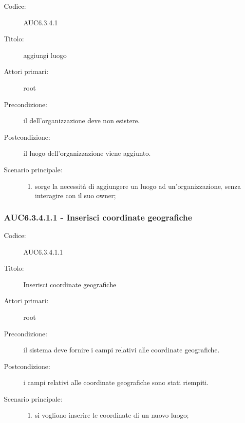\documentclass[casi-duso]{subfiles}
\begin{document}
\begin{description}
  \item[Codice:] AUC6.3.4.1
  \item[Titolo:] aggiungi luogo
  \item[Attori primari:] root
  \item[Precondizione:] il  dell'organizzazione deve non esistere.
  \item[Postcondizione:] il luogo dell'organizzazione viene aggiunto.
  \item[Scenario principale:]
  \begin{enumerate}
    \item sorge la necessità di aggiungere un luogo ad un'organizzazione, senza interagire con il suo owner;
  \end{enumerate}
\end{description}

\subsubsection{AUC6.3.4.1.1 - Inserisci coordinate geografiche}%
\label{subsub:AUC6.3.4.1.1}
\begin{description}
  \item[Codice:] AUC6.3.4.1.1
  \item[Titolo:] Inserisci coordinate geografiche
  \item[Attori primari:] root
  \item[Precondizione:] il sistema deve fornire i campi relativi alle coordinate geografiche.
  \item[Postcondizione:] i campi relativi alle coordinate geografiche sono stati riempiti.
  \item[Scenario principale:]
  \begin{enumerate}
    \item si vogliono inserire le coordinate di un nuovo luogo;
  \end{enumerate}
\end{description}
\end{document}
